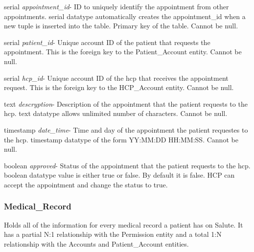 \documentclass[12pt]{report}
\begin{document}
\begin{description}
\item serial \textit{appointment\_id}- ID to uniquely identify the appointment from other appointments. serial datatype automatically creates the appointment\_id when a new tuple is inserted into the table.  Primary key of the table.  Cannot be null.
\item serial \textit{patient\_id}-  Unique account ID of the patient that requests the appointment.  This is the foreign key to the Patient\_Account entity.  Cannot be null.
\item serial \textit{hcp\_id}- Unique account ID of the hcp that receives the appointment request.  This is the foreign key to the HCP\_Account entity.  Cannot be null.
\item text \textit{descryption}- Description of the appointment that the patient requests to the hcp.  text datatype allows unlimited number of characters.  Cannot be null.
\item timestamp \textit{date\_time}- Time and day of the appointment the patient requestes to the hcp.  timestamp datatype of the form YY:MM:DD HH:MM:SS.  Cannot be null.
\item boolean \textit{approved}- Status of the appointment that the patient requests to the hcp.  boolean datatype value is either true or false.  By default it is false.  HCP can accept the appointment and change the status to true.
\end{description}

\subsubsection{Medical\_Record}
Holds all of the information for every medical record a patient has on Salute.  It has a partial N:1 relationship with the Permission entity and a total 1:N relationship with the Accounts and Patient\_Account entities.
\end{document}
